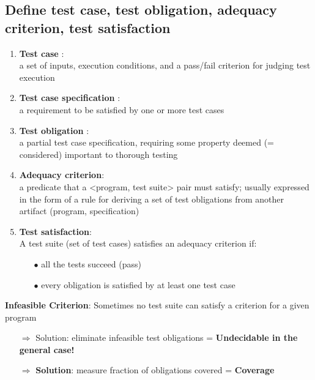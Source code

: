 \documentclass{article}
\begin{document}
\subsection{Define test case, test obligation, adequacy criterion, test satisfaction}
\vspace{-0.5cm}
\begin{multicols}{2}
\begin{enumerate}
    \item \textbf{Test case} :\\
    a set of inputs, execution conditions, and a pass/fail criterion for judging test execution
    \\
    \item \textbf{Test case specification} :\\
    a requirement to be satisfied by one or more test cases\\
    \item \textbf{Test obligation} :\\ 
    a partial test case specification, requiring some property deemed (= considered) important to thorough testing
    \vfill\null\columnbreak
    \item \textbf{Adequacy criterion}:\\ 
    a predicate that a <program, test suite> pair must satisfy; usually expressed in the form of a rule for deriving a set of test obligations from another artifact (program, specification)\\
    \item \textbf{Test satisfaction}:\\ 
    A test suite (set of test cases) satisfies an adequacy criterion if:
    \begin{itemize}
        \item [$\bullet$]all the tests succeed (pass)
        \item [$\bullet$]every obligation is satisfied by at least one test case
    \end{itemize}
    \vfill\null
\end{enumerate}
\end{multicols}
\vspace*{-0.5cm}
\noindent\textbf{Infeasible Criterion}: Sometimes
no test
suite
can
satisfy
a
criterion
for
a
given
program 
\begin{itemize}
    \item [$\Rightarrow$]Solution:
eliminate infeasible
test
obligations = \textbf{Undecidable
in
the
general
case!}
    \item [$\Rightarrow$]\textbf{Solution}:
measure fraction
of
obligations
covered = \textbf{Coverage}
\end{itemize}
\end{document}
